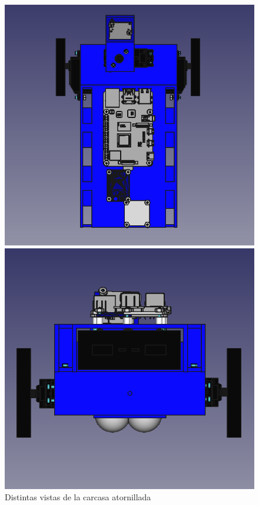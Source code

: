 \begin{figure}[ht!]
	\centering
	\begin{minipage}{0.45\linewidth}
		\centering
		\includegraphics[width=\linewidth]{figs/cap5/superior1m.png}
		\caption*{\centering}
	\end{minipage}
	\hspace{1cm}
	\begin{minipage}{0.45\linewidth}
		\centering
		\includegraphics[width=\linewidth]{figs/cap5/superior2m.png}
		\caption*{\centering}
	\end{minipage}
	\caption{Distintas vistas de la carcasa atornillada}
	\label{fig:psuperiormontada}
\end{figure}


